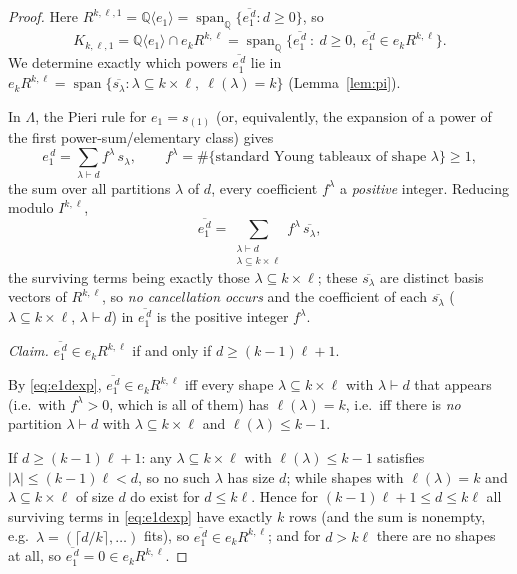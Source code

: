 \documentclass{amsart}
\theoremstyle{definition}
\newcommand{\Q}{\mathbb{Q}}
\newcommand{\rkl}{R^{k,\ell}}
\begin{document}
\begin{proof}
Here $R^{k,\ell,1}=\Q\langle e_1\rangle=\operatorname{span}_\Q\{\overline{e_1^{\,d}}
:d\ge0\}$, so
\[
K_{k,\ell,1}=\Q\langle e_1\rangle\cap e_k\rkl
=\operatorname{span}_\Q\{\overline{e_1^{\,d}}\ :\ d\ge0,\ \overline{e_1^{\,d}}\in e_k\rkl\}.
\]
We determine exactly which powers $\overline{e_1^{\,d}}$ lie in
$e_k\rkl=\operatorname{span}\{\overline{s_\lambda}:\lambda\subseteq k\times\ell,\
\ell(\lambda)=k\}$ (Lemma~\ref{lem:pi}).

In $\Lambda$, the Pieri rule for $e_1=s_{(1)}$ (or, equivalently, the expansion of a
power of the first power-sum/elementary class) gives
\[
e_1^{\,d}=\sum_{\lambda\vdash d} f^{\lambda}\, s_\lambda ,
\qquad f^\lambda=\#\{\text{standard Young tableaux of shape }\lambda\}\ge1 ,
\]
the sum over all partitions $\lambda$ of $d$, every coefficient $f^\lambda$ a
\emph{positive} integer. Reducing modulo $I^{k,\ell}$,
\begin{equation}\label{eq:e1dexp}
\overline{e_1^{\,d}}=\sum_{\substack{\lambda\vdash d\\ \lambda\subseteq k\times\ell}}
f^{\lambda}\,\overline{s_\lambda},
\end{equation}
the surviving terms being exactly those $\lambda\subseteq k\times\ell$; these
$\overline{s_\lambda}$ are distinct basis vectors of $\rkl$, so \emph{no cancellation
occurs} and the coefficient of each $\overline{s_\lambda}$ ($\lambda\subseteq
k\times\ell$, $\lambda\vdash d$) in $\overline{e_1^{\,d}}$ is the positive integer
$f^\lambda$.

\emph{Claim.} $\overline{e_1^{\,d}}\in e_k\rkl$ if and only if $d\ge(k-1)\ell+1$.

By \eqref{eq:e1dexp}, $\overline{e_1^{\,d}}\in e_k\rkl$ iff every shape
$\lambda\subseteq k\times\ell$ with $\lambda\vdash d$ that appears (i.e.\ with
$f^\lambda>0$, which is all of them) has $\ell(\lambda)=k$, i.e.\ iff there is
\emph{no} partition $\lambda\vdash d$ with $\lambda\subseteq k\times\ell$ and
$\ell(\lambda)\le k-1$.

If $d\ge(k-1)\ell+1$: any $\lambda\subseteq k\times\ell$ with $\ell(\lambda)\le k-1$
satisfies $|\lambda|\le(k-1)\ell<d$, so no such $\lambda$ has size $d$; while shapes
with $\ell(\lambda)=k$ and $\lambda\subseteq k\times\ell$ of size $d$ do exist for
$d\le k\ell$. Hence for $(k-1)\ell+1\le d\le k\ell$ all surviving terms in
\eqref{eq:e1dexp} have exactly $k$ rows (and the sum is nonempty, e.g.\
$\lambda=(\lceil d/k\rceil,\dots)$ fits), so $\overline{e_1^{\,d}}\in e_k\rkl$;
and for $d>k\ell$ there are no shapes at all, so $\overline{e_1^{\,d}}=0\in e_k\rkl$.


\end{proof}
\end{document}
